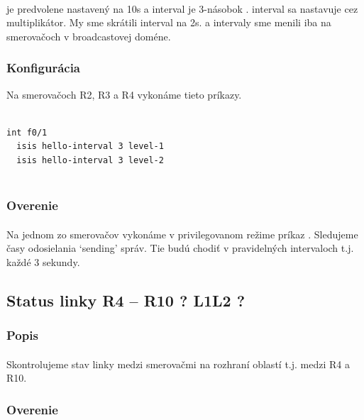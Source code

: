 \documentclass[12pt,twoside,a4paper]{report}
\begin{document}
\paragraph{}
 je predvolene nastavený na 10s a  interval je 3-násobok .  interval sa nastavuje cez multiplikátor. My sme skrátili  interval na 2s.  a  intervaly sme menili iba na smerovačoch v broadcastovej doméne.


\subsubsection{Konfigurácia}
Na smerovačoch R2, R3 a R4 vykonáme tieto príkazy.

\noindent
{\selectfont
\begin{small}
\begin{verbatim}

int f0/1
  isis hello-interval 3 level-1
  isis hello-interval 3 level-2


\end{verbatim}
\end{small}
}

\subsubsection{Overenie}
\paragraph{}
Na jednom zo smerovačov vykonáme v privilegovanom režime príkaz . Sledujeme časy odosielania ‘sending’ správ. Tie budú chodiť v pravidelných intervaloch t.j. každé 3 sekundy.




\subsection{Status linky R4 – R10 ? L1L2 ?}
\subsubsection{Popis}
\paragraph{}
Skontrolujeme stav linky medzi smerovačmi na rozhraní oblastí t.j. medzi R4 a R10.

\subsubsection{Overenie}
\end{document}
